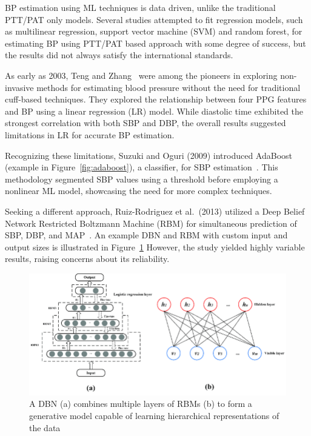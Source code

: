 BP estimation using ML techniques is data driven, unlike the traditional PTT/PAT only models.
Several studies attempted to fit regression models, such as multilinear regression, support vector machine (SVM) and random forest, for estimating BP using PTT/PAT based approach with some degree of success, but the results did not always satisfy the international standards.

As early as 2003, Teng and Zhang~\cite{tengContinuousNoninvasiveEstimation2003} were among the pioneers in exploring non-invasive methods for estimating blood pressure without the need for traditional cuff-based techniques.
They explored the relationship between four PPG features and BP using a linear regression (LR) model.
While diastolic time exhibited the strongest correlation with both SBP and DBP, the overall results suggested limitations in LR for accurate BP estimation.

Recognizing these limitations, Suzuki and Oguri (2009) introduced AdaBoost (example in Figure~\ref{fig:adaboost}), a classifier, for SBP estimation~\cite{suzukiCufflessBloodPressure2009}.
This methodology segmented SBP values using a threshold before employing a nonlinear ML model, showcasing the need for more complex techniques.

Seeking a different approach, Ruiz-Rodriguez et al.\ (2013) utilized a Deep Belief Network Restricted Boltzmann Machine (RBM) for simultaneous prediction of SBP, DBP, and MAP~\cite{ruiz-rodriguezInnovativeContinuousNoninvasive2013}.
An example DBN and RBM with custom input and output sizes is illustrated in Figure~\ref{fig:rbm}
However, the study yielded highly variable results, raising concerns about its reliability.

\begin{figure}[h]
    \centering
    \includegraphics[scale=0.5]{images/ml/RBM}
    \caption{\small A DBN (a) combines multiple layers of RBMs (b) to form a generative model capable of learning hierarchical representations of the data~\cite{ouIntegratingCellularAutomata2019}}
    \label{fig:rbm}
\end{figure}

